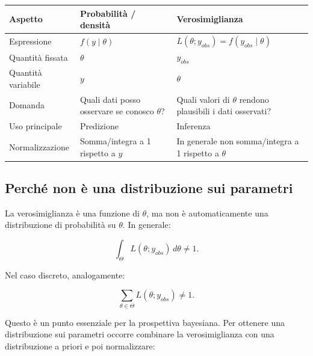 \documentclass[
  italian,
  letterpaper,
  a4paper,
  11pt,
  open=any]{scrbook}
\newcounter{none} %
\theoremstyle{plain}
\theoremstyle{definition}
\theoremstyle{definition}
\theoremstyle{remark}
\begin{document}
{\def\LTcaptype{none} %
\begin{longtable}[]{@{}
  >{\raggedright\arraybackslash}p{}
  >{\raggedright\arraybackslash}p{}
  >{\raggedright\arraybackslash}p{}@{}}
\toprule\noalign{}
\begin{minipage}[b]{\linewidth}\raggedright
Aspetto
\end{minipage} & \begin{minipage}[b]{\linewidth}\raggedright
Probabilità / densità
\end{minipage} & \begin{minipage}[b]{\linewidth}\raggedright
Verosimiglianza
\end{minipage} \\
\midrule\noalign{}
\endhead
\bottomrule\noalign{}
\endlastfoot
Espressione & \(f(y \mid \theta)\) &
\(L(\theta; y_{obs}) = f(y_{obs} \mid \theta)\) \\
Quantità fissata & \(\theta\) & \(y_{obs}\) \\
Quantità variabile & \(y\) & \(\theta\) \\
Domanda & Quali dati posso osservare se conosco \(\theta\)? & Quali
valori di \(\theta\) rendono plausibili i dati osservati? \\
Uso principale & Predizione & Inferenza \\
Normalizzazione & Somma/integra a 1 rispetto a \(y\) & In generale non
somma/integra a 1 rispetto a \(\theta\) \\
\end{longtable}
}

\subsection{Perché non è una distribuzione sui
parametri}\label{perchuxe9-non-uxe8-una-distribuzione-sui-parametri}

La verosimiglianza è una funzione di \(\theta\), ma non è
automaticamente una distribuzione di probabilità su \(\theta\). In
generale:

\[
\int_\Theta L(\theta; y_{obs})\,d\theta \neq 1.
\]

Nel caso discreto, analogamente:

\[
\sum_{\theta \in \Theta} L(\theta; y_{obs}) \neq 1.
\]

Questo è un punto essenziale per la prospettiva bayesiana. Per ottenere
una distribuzione sui parametri occorre combinare la verosimiglianza con
una distribuzione a priori e poi normalizzare:
\end{document}
